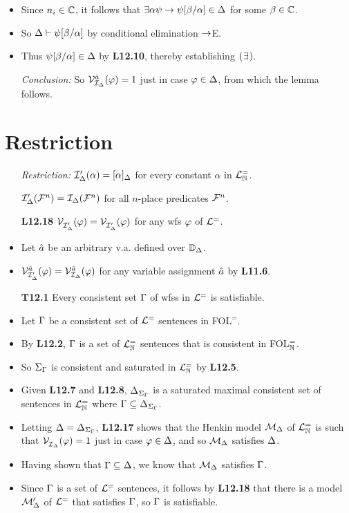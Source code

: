 \documentclass[a4paper, 11pt]{article} %
\begin{document}
\begin{itemize}
    \item Since $n_i\in\mathbb{C}$, it follows that $\exists \alpha\psi\rightarrow\psi[\beta/\alpha]\in\Delta$ for some $\beta\in\mathbb{C}$.
    \item So $\Delta\vdash\psi[\beta/\alpha]$ by conditional elimination $\rightarrow$E. 
    \item Thus $\psi[\beta/\alpha]\in\Delta$ by \textbf{L12.10}, thereby establishing $(\hspace{.7pt}\exists\hspace{.7pt})$.
  \item[\it Conclusion:] So $\mathcal{V}_{\mathcal{I}_{\Delta}}^{\hat{a}}(\varphi)=1$ just in case $\varphi\in\Delta$, from which the lemma follows.
\end{itemize}





\section*{Restriction}

\begin{itemize}
  \item[\it Restriction:] $\mathcal{I}'_{\Delta}(\alpha)=[\alpha]_{\Delta}$ for every constant $\alpha$ in $\mathcal{L}^{=}_{\mathbb{N}}$.
    \item[] $\mathcal{I}'_{\Delta}(\mathcal{F}^n)=\mathcal{I}_{\Delta}(\mathcal{F}^n)$ for all $n$-place predicates $\mathcal{F}^n$. 
  \item[\bf L12.18] $\mathcal{V}_{\mathcal{I}'_{\Delta}}^{}(\varphi) = \mathcal{V}_{\mathcal{I}'_{\Delta}}^{}(\varphi)$ for any wfs $\varphi$ of $\mathcal{L}^=$.
    \item Let $\hat{a}$ be an arbitrary v.a. defined over $\mathbb{D}_{\Delta}$. 
    \item $\mathcal{V}_{\mathcal{I}'_{\Delta}}^{\hat{a}}(\varphi) = \mathcal{V}_{\mathcal{I}_{\Delta}}^{\hat{a}}(\varphi)$ for any variable assignment $\hat{a}$ by \textbf{L11.6}.
  \item[\bf T12.1] Every consistent set $\Gamma$ of wfss in $\mathcal{L}^=$ is satisfiable.
    \item Let $\Gamma$ be a consistent set of $\mathcal{L}^=$ sentences in FOL$^=$.
    \item By \textbf{L12.2}, $\Gamma$ is a set of $\mathcal{L}^{=}_{\mathbb{N}}$ sentences that is consistent in FOL$^=_{\mathbb{N}}$.
    \item So $\Sigma_{\Gamma}$ is consistent and saturated in $\mathcal{L}^{=}_{\mathbb{N}}$ by \textbf{L12.5}. 
    \item Given \textbf{L12.7} and \textbf{L12.8}, $\Delta_{\Sigma_{\Gamma}}$ is a saturated maximal consistent set of sentences in $\mathcal{L}^{=}_{\mathbb{N}}$ where $\Gamma\subseteq\Delta_{\Sigma_{\Gamma}}$.
    \item Letting $\Delta=\Delta_{\Sigma_{\Gamma}}$, \textbf{L12.17} shows that the Henkin model $\mathcal{M}_{\Delta}$ of $\mathcal{L}^{=}_{\mathbb{N}}$ is such that $\mathcal{V}_{\mathcal{I}_{\Delta}}^{}{}(\varphi) = 1$ just in case $\varphi\in\Delta$, and so $\mathcal{M}_{\Delta}$ satisfies $\Delta$.
    \item Having shown that $\Gamma\subseteq\Delta$, we know that $\mathcal{M}_{\Delta}$ satisfies $\Gamma$.
    \item Since $\Gamma$ is a set of $\mathcal{L}^=$ sentences, it follows by \textbf{L12.18} that there is a model $\mathcal{M}'_{\Delta}$ of $\mathcal{L}^=$ that satisfies $\Gamma$, so $\Gamma$ is satisfiable.
\end{itemize}
\end{document}
